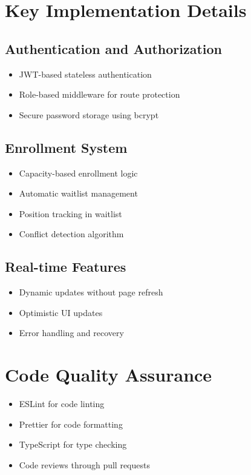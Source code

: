 \documentclass[12pt,a4paper]{report}
\begin{document}
\section{Key Implementation Details}

\subsection{Authentication and Authorization}
\begin{itemize}[leftmargin=*]
    \item JWT-based stateless authentication
    \item Role-based middleware for route protection
    \item Secure password storage using bcrypt
\end{itemize}

\subsection{Enrollment System}
\begin{itemize}[leftmargin=*]
    \item Capacity-based enrollment logic
    \item Automatic waitlist management
    \item Position tracking in waitlist
    \item Conflict detection algorithm
\end{itemize}

\subsection{Real-time Features}
\begin{itemize}[leftmargin=*]
    \item Dynamic updates without page refresh
    \item Optimistic UI updates
    \item Error handling and recovery
\end{itemize}

\section{Code Quality Assurance}
\begin{itemize}[leftmargin=*]
    \item ESLint for code linting
    \item Prettier for code formatting
    \item TypeScript for type checking
    \item Code reviews through pull requests
\end{itemize}
\end{document}
